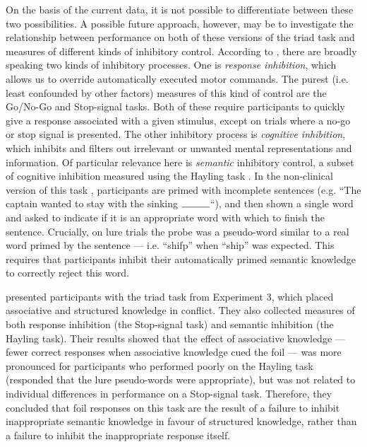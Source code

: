 On the basis of the current data,
it is not possible to differentiate between these two possibilities.
A possible future approach, however,
may be to investigate the relationship between
performance on both of these versions of the triad task
and measures of different kinds of inhibitory control.
According to \citet{Diamond2013},
there are broadly speaking two kinds of inhibitory processes.
One is \emph{response inhibition},
which allows us to override automatically executed motor commands.
The purest (i.e. least confounded by other factors) measures of this kind of control
are the Go/No-Go \citep{Donders1868} and Stop-signal \citep{Lappin1966} tasks.
Both of these require participants to quickly give a response
associated with a given stimulus,
except on trials where a no-go or stop signal is presented.
The other inhibitory process is \emph{cognitive inhibition},
which inhibits and filters out irrelevant or unwanted
mental representations and information.
Of particular relevance here is \emph{semantic} inhibitory control,
a subset of cognitive inhibition measured using the Hayling task \citep{Burgess1997}.
In the non-clinical version of this task \citep{Markovits2004},
participants are primed with incomplete sentences
(e.g. ``The captain wanted to stay with the sinking $\rule{1cm}{0.15mm}$``),
and then shown a single word and asked to indicate if it is an appropriate word
with which to finish the sentence.
Crucially, on lure trials the probe was a pseudo-word
similar to a real word primed by the sentence ---
i.e. ``shifp'' when ``ship'' was expected.
This requires that participants inhibit their automatically primed
semantic knowledge to correctly reject this word.

\citet{Bright} presented participants with the triad task from Experiment 3,
which placed associative and structured knowledge in conflict.
They also collected measures of both response inhibition (the Stop-signal task)
and semantic inhibition (the Hayling task).
Their results showed that the effect of associative knowledge
--- fewer correct responses when associative knowledge cued the foil ---
was more pronounced for participants who performed poorly on the Hayling task
(responded that the lure pseudo-words were appropriate),
but was not related to individual differences in
performance on a Stop-signal task.
Therefore, they concluded that foil responses on this task
are the result of a failure to inhibit
inappropriate semantic knowledge in favour of structured knowledge,
rather than a failure to inhibit the inappropriate response itself.

